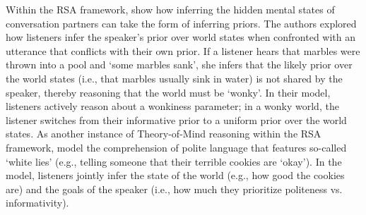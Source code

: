 \documentclass[11pt,a4paper]{article}
\begin{document}

Within the RSA framework,  show how inferring the hidden mental states of conversation partners can take the form of inferring priors. The authors explored how listeners infer the speaker's prior over world states when confronted with an utterance that conflicts with their own prior. If a listener hears that marbles were thrown into a pool and `some marbles sank', she infers that the likely prior over the world states (i.e., that marbles usually sink in water) is not shared by the speaker, thereby reasoning that the world must be `wonky'. In their model, listeners actively reason about a wonkiness parameter; in a wonky world, the listener switches from their informative prior to a uniform prior over the world states.
As another instance of Theory-of-Mind reasoning within the RSA framework,  model the comprehension of polite language that features so-called `white lies' (e.g., telling someone that their terrible cookies are `okay'). In the model, listeners jointly infer the state of the world (e.g., how good the cookies are) and the goals of the speaker (i.e., how much they prioritize politeness vs. informativity).  


\end{document}
